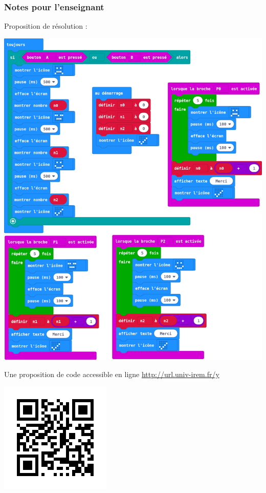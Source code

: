 \subsubsection{Notes pour l'enseignant}

%
%
\begin{methode}
Proposition de résolution :
\begin{center}
    \includegraphics[width=0.75\linewidth]{res/mb-jpo-code02.png}    
\end{center}
\end{methode}


\begin{remarque}
    Une proposition de code accessible en ligne
\url{http://url.univ-irem.fr/y}
    \begin{center}
		\href {http://url.univ-irem.fr/y}
		{\includegraphics[width=0.2\linewidth]{res/mb-jpo-code02-qr.png}}
    \end{center}
\end{remarque}

